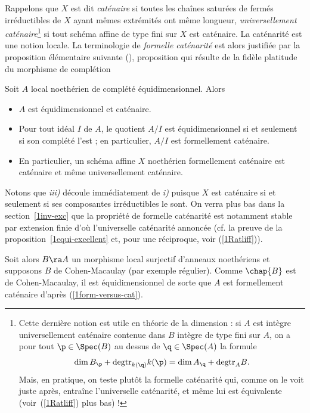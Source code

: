 \documentclass[10pt]{../fichiers-configuration-latex/smfart}
\begin{document}
\bigskip

Rappelons que $X$ est dit \emph{caténaire} si toutes les chaînes saturées de fermés irréductibles
de $X$ ayant mêmes extrémités ont même longueur, \emph{universellement
caténaire}\footnote{\label{1form-dim}Cette dernière notion est utile en théorie de la dimension :
si $A$ est intègre universellement caténaire contenue dans $B$ intègre de type fini sur $A$, on a
pour tout $\p\in\Spec(B)$ au dessus de $\q\in\Spec(A)$ la formule $$\dim
B_\p+\text{degtr}_{k(\q)}k(\p)=\dim A_\q+\text{degtr}_AB.$$ Mais, en pratique, on teste plutôt la
formelle caténarité qui, comme on le voit juste après, entraîne l'universelle caténarité, et même
lui est équivalente (voir~(\ref{1Ratliff}) plus bas) !} si tout schéma affine de type fini sur $X$
est caténaire. La caténarité est une notion locale. La terminologie de \emph{formelle caténarité}
est alors justifiée par la proposition élémentaire suivante (), proposition qui
résulte de la fidèle platitude du morphisme de complétion

\begin{lemme}\label{1form-versus-cat} \label{1note-cat-non uni cat}Soit $A$ local noethérien de
complété équidimensionnel. Alors \begin{itemize} \item[i)] $A$ est équidimensionnel et caténaire.
\item[ii)]Pour tout idéal $I$ de $A$, le quotient $A/I$ est équidimensionnel si et seulement si son
complété l'est ; en particulier, $A/I$ est formellement caténaire.  \item[iii)] En particulier, un
schéma affine $X$ noethérien formellement caténaire est caténaire et même universellement caténaire.
\end{itemize} \end{lemme}

Notons que \textit{iii)} découle immédiatement de \textit{i)} puisque $X$ est caténaire si et
seulement si ses composantes irréductibles le sont. On verra plus bas dans la section~\ref{1inv-exc}
que la propriété de formelle caténarité est notamment stable par extension finie d'où l'universelle
caténarité annoncée (cf. la preuve de la proposition~\ref{1equi-excellent} et, pour une réciproque,
voir (\ref{1Ratliff})).

\begin{exemple}\label{1CM-form-cat}Soit alors $B\ra A$ un morphisme local surjectif d'anneaux
noethériens et supposons $B$ de Cohen-Macaulay (par exemple régulier).  Comme $\chap{B}$ est de
Cohen-Macaulay, il est équidimensionnel de sorte que $A$ est formellement caténaire d'après
(\ref{1form-versus-cat}).  \end{exemple}
\end{document}
